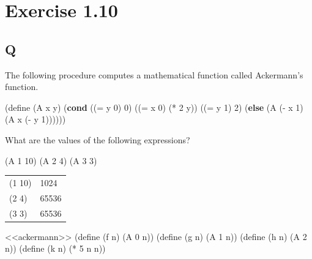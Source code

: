 \documentclass[
]{article}
\newenvironment{Shaded}{}{}
\newcommand{\DecValTok}[1]{\textcolor[rgb]{0.25,0.63,0.44}{#1}}
\newcommand{\ExtensionTok}[1]{#1}
\newcommand{\FunctionTok}[1]{\textcolor[rgb]{0.02,0.16,0.49}{#1}}
\newcommand{\KeywordTok}[1]{\textcolor[rgb]{0.00,0.44,0.13}{\textbf{#1}}}
\newcommand{\NormalTok}[1]{#1}
\newcommand{\OperatorTok}[1]{\textcolor[rgb]{0.40,0.40,0.40}{#1}}
\begin{document}
\hypertarget{exercise-1.10}{%
\section{Exercise 1.10}\label{exercise-1.10}}

\hypertarget{q-9}{%
\subsection{Q}\label{q-9}}

The following procedure computes a mathematical function called
Ackermann's function.

\hypertarget{ackermann}{%
\label{ackermann}}%
\begin{Shaded}
\begin{Highlighting}[numbers=left,,]
\NormalTok{(}\ExtensionTok{define}\FunctionTok{ }\NormalTok{(A x y)}
\NormalTok{  (}\KeywordTok{cond}\NormalTok{ ((}\OperatorTok{=}\NormalTok{ y }\DecValTok{0}\NormalTok{) }\DecValTok{0}\NormalTok{)}
\NormalTok{        ((}\OperatorTok{=}\NormalTok{ x }\DecValTok{0}\NormalTok{) (}\OperatorTok{*} \DecValTok{2}\NormalTok{ y))}
\NormalTok{        ((}\OperatorTok{=}\NormalTok{ y }\DecValTok{1}\NormalTok{) }\DecValTok{2}\NormalTok{)}
\NormalTok{        (}\KeywordTok{else}\NormalTok{ (A (}\OperatorTok{{-}}\NormalTok{ x }\DecValTok{1}\NormalTok{)}
\NormalTok{                 (A x (}\OperatorTok{{-}}\NormalTok{ y }\DecValTok{1}\NormalTok{))))))}
\end{Highlighting}
\end{Shaded}

What are the values of the following expressions?

\begin{Shaded}
\begin{Highlighting}[numbers=left,,]
\NormalTok{(A }\DecValTok{1} \DecValTok{10}\NormalTok{)}
\NormalTok{(A }\DecValTok{2} \DecValTok{4}\NormalTok{)}
\NormalTok{(A }\DecValTok{3} \DecValTok{3}\NormalTok{)}
\end{Highlighting}
\end{Shaded}

\begin{longtable}[]{@{}ll@{}}
\toprule
\endhead
(1 10) & 1024 \\
(2 4) & 65536 \\
(3 3) & 65536 \\
\bottomrule
\end{longtable}

\hypertarget{EX1-10-defs}{%
\label{EX1-10-defs}}%
\begin{Shaded}
\begin{Highlighting}[numbers=left,,]
\NormalTok{\textless{}\textless{}ackermann\textgreater{}\textgreater{}}
\NormalTok{(}\ExtensionTok{define}\FunctionTok{ }\NormalTok{(f n) (A }\DecValTok{0}\NormalTok{ n))}
\NormalTok{(}\ExtensionTok{define}\FunctionTok{ }\NormalTok{(g n) (A }\DecValTok{1}\NormalTok{ n))}
\NormalTok{(}\ExtensionTok{define}\FunctionTok{ }\NormalTok{(h n) (A }\DecValTok{2}\NormalTok{ n))}
\NormalTok{(}\ExtensionTok{define}\FunctionTok{ }\NormalTok{(k n) (}\OperatorTok{*} \DecValTok{5}\NormalTok{ n n))}
\end{Highlighting}
\end{Shaded}
\end{document}
